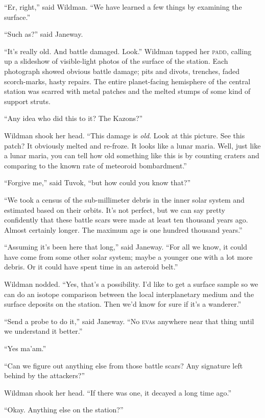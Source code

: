 \documentclass[twoside,letterpaper,12pt]{memoir}
\begin{document}
``Er, right,'' said Wildman. ``We have learned a few things by examining the surface.''

``Such as?'' said Janeway.

``It's really old. And battle damaged. Look.'' Wildman tapped her \textsc{padd}, calling up a slideshow of visible-light photos of the surface of the station. Each photograph showed obvious battle damage; pits and divots, trenches, faded scorch-marks, hasty repairs. The entire planet-facing hemisphere of the central station was scarred with metal patches and the melted stumps of some kind of support struts.

``Any idea who did this to it? The Kazons?''

Wildman shook her head. ``This damage is \textit{old}. Look at this picture. See this patch? It obviously melted and re-froze. It looks like a lunar maria. Well, just like a lunar maria, you can tell how old something like this is by counting craters and comparing to the known rate of meteoroid bombardment.''

``Forgive me,'' said Tuvok, ``but how could you know that?''

``We took a census of the sub-millimeter debris in the inner solar system and estimated based on their orbits. It's not perfect, but we can say pretty confidently that these battle scars were made at least ten thousand years ago. Almost certainly longer. The maximum age is one hundred thousand years.''

``Assuming it's been here that long,'' said Janeway. ``For all we know, it could have come from some other solar system; maybe a younger one with a lot more debris. Or it could have spent time in an asteroid belt.''

Wildman nodded. ``Yes, that's a possibility. I'd like to get a surface sample so we can do an isotope comparison between the local interplanetary medium and the surface deposits on the station. Then we'd know for sure if it's a wanderer.''

``Send a probe to do it,'' said Janeway. ``No \textsc{eva}s anywhere near that thing until we understand it better.''

``Yes ma'am.''

``Can we figure out anything else from those battle scars? Any signature left behind by the attackers?''

Wildman shook her head. ``If there was one, it decayed a long time ago.''

``Okay. Anything else on the station?''
\end{document}
